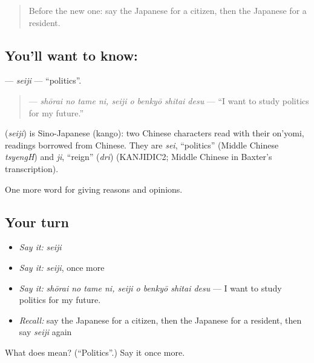 \begin{quote}
Before the new one: say the Japanese for a citizen, then the Japanese for a resident.
\end{quote}

\subsection*{You'll want to know: }
\textbf{} — \emph{seiji} — \textquotedblleft{}politics\textquotedblright{}.

\begin{quote}
\textbf{  } — \emph{shōrai no tame ni, seiji o benkyō shitai desu} — \textquotedblleft{}I want to study politics for my future.\textquotedblright{}
\end{quote}

\begin{cousinweb}
\textbf{} (\emph{seiji}) is Sino-Japanese (kango): two Chinese characters read with their on'yomi, readings borrowed from Chinese. They are \emph{sei}, \textquotedblleft{}politics\textquotedblright{} (Middle Chinese \emph{tsyengH}) and \emph{ji}, \textquotedblleft{}reign\textquotedblright{} (\emph{dri}) (KANJIDIC2; Middle Chinese in Baxter's transcription).
\end{cousinweb}

\begin{grammarlens}[title={What you've built}]
One more word for giving reasons and opinions.
\end{grammarlens}

\subsection*{Your turn}
\begin{itemize}
\raggedright
  \item \emph{Say it:} \emph{seiji}
  \item \emph{Say it:} \emph{seiji}, once more
  \item \emph{Say it:} \emph{shōrai no tame ni, seiji o benkyō shitai desu} — I want to study politics for my future.
  \item \emph{Recall:} say the Japanese for a citizen, then the Japanese for a resident, then say \emph{seiji} again
\end{itemize}

\begin{tcolorbox}[breakable,colback=teal!4,colframe=teal!35!black,title={Before you move on}]
What does  mean? (\textquotedblleft{}Politics\textquotedblright{}.) Say it once more.
\end{tcolorbox}
